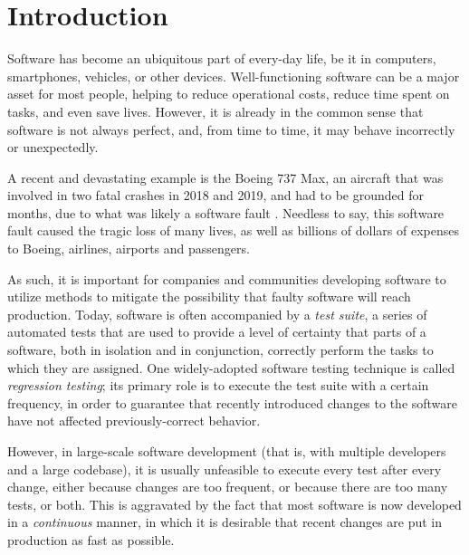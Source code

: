 \chapter{Introduction}\label{chap:intro}

Software has become an ubiquitous part of every-day life, be it in computers, smartphones, vehicles, or other devices.
Well-functioning software can be a major asset for most people, helping to reduce operational costs, reduce time spent on tasks, and even save lives.
However, it is already in the common sense that software is not always perfect, and, from time to time, it may behave incorrectly or unexpectedly.

A recent and devastating example is the Boeing 737 Max, an aircraft that was involved in two fatal crashes in 2018 and 2019, and had to be grounded for months, due to what was likely a software fault \cite{levin_latest_2019}.
Needless to say, this software fault caused the tragic loss of many lives, as well as billions of dollars of expenses to Boeing, airlines, airports and passengers.

As such, it is important for companies and communities developing software to utilize methods to mitigate the possibility that faulty software will reach production.
Today, software is often accompanied by a \textit{test suite}, a series of automated tests that are used to provide a level of certainty that parts of a software, both in isolation and in conjunction, correctly perform the tasks to which they are assigned.
One widely-adopted software testing technique is called \textit{regression testing}; its primary role is to execute the test suite with a certain frequency, in order to guarantee that recently introduced changes to the software have not affected previously-correct behavior.

However, in large-scale software development (that is, with multiple developers and a large codebase), it is usually unfeasible to execute every test after every change, either because changes are too frequent, or because there are too many tests, or both.
This is aggravated by the fact that most software is now developed in a \textit{continuous} manner, in which it is desirable that recent changes are put in production as fast as possible.

